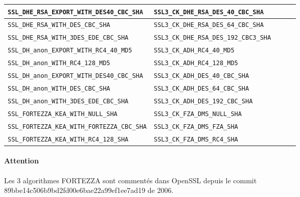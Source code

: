 \documentclass[a4paper,11pt,french]{article}
\begin{document}
\begin{center}
\begin{tabularx}{17cm}{|l|X|l|X|l|}
\hline
\verb+SSL_DHE_RSA_EXPORT_WITH_DES40_CBC_SHA+ & \verb+SSL3_CK_DHE_RSA_DES_40_CBC_SHA+\\
\hline
\verb+SSL_DHE_RSA_WITH_DES_CBC_SHA+ & \verb+SSL3_CK_DHE_RSA_DES_64_CBC_SHA+\\
\hline
\verb+SSL_DHE_RSA_WITH_3DES_EDE_CBC_SHA+ & \verb+SSL3_CK_DHE_RSA_DES_192_CBC3_SHA+\\
\hline 
\verb+SSL_DH_anon_EXPORT_WITH_RC4_40_MD5+ & \verb+SSL3_CK_ADH_RC4_40_MD5+\\
\hline
\verb+SSL_DH_anon_WITH_RC4_128_MD5+ & \verb+SSL3_CK_ADH_RC4_128_MD5+\\
\hline
\verb+SSL_DH_anon_EXPORT_WITH_DES40_CBC_SHA+ & \verb+SSL3_CK_ADH_DES_40_CBC_SHA+\\
\hline
\verb+SSL_DH_anon_WITH_DES_CBC_SHA+& \verb+SSL3_CK_ADH_DES_64_CBC_SHA+\\
\hline
\verb+SSL_DH_anon_WITH_3DES_EDE_CBC_SHA+ & \verb+SSL3_CK_ADH_DES_192_CBC_SHA+\\
\hline
\verb+SSL_FORTEZZA_KEA_WITH_NULL_SHA+ & \verb+SSL3_CK_FZA_DMS_NULL_SHA+\\
\hline
\verb+SSL_FORTEZZA_KEA_WITH_FORTEZZA_CBC_SHA+ & \verb+SSL3_CK_FZA_DMS_FZA_SHA+\\
\hline
\verb+SSL_FORTEZZA_KEA_WITH_RC4_128_SHA+ & \verb+SSL3_CK_FZA_DMS_RC4_SHA+\\
\hline
\end{tabularx}
\end{center}

\paragraph{Attention} Les 3 algorithmes FORTEZZA sont commentés dans OpenSSL depuis le commit\\
 89bbe14c506b9bd2fd00e6bae22a99ef1ee7ad19 de 2006.
 
\end{document}
